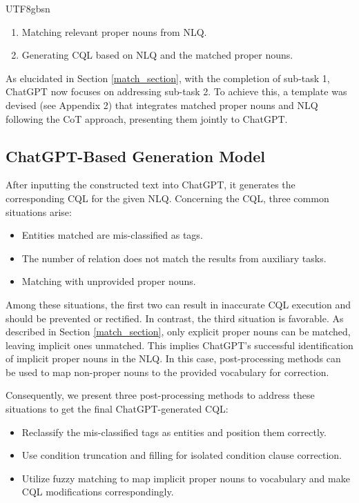 \documentclass[runningheads]{llncs}
\begin{document}
\begin{CJK*}{UTF8}{gbsn}
\begin{enumerate}[label=\arabic*.]
    \item Matching relevant proper nouns from NLQ.
    \item Generating CQL based on NLQ and the matched proper nouns.
\end{enumerate}

As elucidated in Section \ref{match_section}, with the completion of sub-task 1, ChatGPT now focuses on addressing sub-task 2. To achieve this, a template was devised (see Appendix 2) that integrates matched proper nouns and NLQ following the CoT approach, presenting them jointly to ChatGPT.


\subsection{ChatGPT-Based Generation Model}
\label{post_process_section}

After inputting the constructed text into ChatGPT, it generates the corresponding CQL for the given NLQ. 
Concerning the CQL, three common situations arise:

\renewcommand{\labelitemi}{\textbullet}
\begin{itemize}
    \item Entities matched are mis-classified as tags.
    \item The number of relation does not match the results from auxiliary tasks.
    \item Matching with unprovided proper nouns.
\end{itemize}

Among these situations, the first two can result in inaccurate CQL execution and should be prevented or rectified. In contrast, the third situation is favorable. As described in Section \ref{match_section}, only explicit proper nouns can be matched, leaving implicit ones unmatched. This implies ChatGPT's successful identification of implicit proper nouns in the NLQ. In this case, post-processing methods can be used to map non-proper nouns to the provided vocabulary for correction.

Consequently, we present three post-processing methods to address these situations to get the final ChatGPT-generated CQL:

\renewcommand{\labelitemi}{\textbullet}
\begin{itemize}
    \item Reclassify the mis-classified tags as entities and position them correctly.
    \item Use condition truncation and filling for isolated condition clause correction.
    \item Utilize fuzzy matching to map implicit proper nouns to vocabulary and make CQL modifications correspondingly.
\end{itemize}


\end{CJK*}
\end{document}

